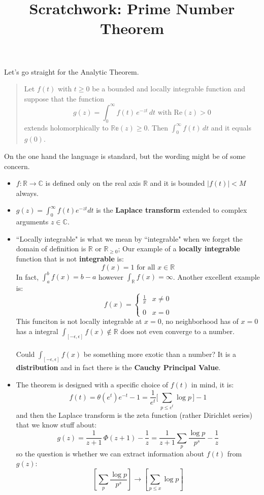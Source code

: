 \documentclass[12pt]{article}
\title{Scratchwork: Prime Number Theorem}
\date{}
\begin{document}

\sffamily

\maketitle

\noindent Let's go straight for the Analytic Theorem. 
\begin{quotation}Let $f(t)$ with $t \geq 0$ be a bounded and locally integrable function and suppose that the function
$$ g(z) = \int_0^\infty f(t) \, e^{-zt} \, dt \text{ with }\mathrm{Re}(z) > 0 $$
extends holomorphically to $\mathbb{Re}(z) \geq 0$.  Then $\int_0^\infty f(t)\, dt$ and it equals $g(0)$.
\end{quotation}
On the one hand the language is standard, but the wording might be of some concern.  
\begin{itemize}
\item $f: \mathbb{R} \to \mathbb{C}$ is defined only on the real axis $\mathbb{R}$ and it is bounded $ |f(t)| < M$ always.
\item $g(z) = \int_0^\infty f(t) e^{-zt} dt$ is the \textbf{Laplace transform} extended to complex arguments $z \in \mathbb{C}$. 
\item ``Locally integrable" is what we mean by ``integrable" when we forget the domain of definition is $\mathbb{R}$ or $\mathbb{R}_{\geq 0}$;  Our example of a \textbf{locally integrable} function that is not \textbf{integrable}  is:
$$ f(x) = 1 \text{ for all }x \in \mathbb{R} $$
In fact, $\int_a^b f(x) = b - a$ however $\int_\mathbb{R} f(x)= \infty$.  Another excellent example is:
$$ f(x) = \left\{
\begin{array}{cc}
\frac{1}{x} & x \neq 0 \\ \\
0 & x = 0 \end{array}
 \right. $$
This funciton is not locally integrable at $x = 0$, no neighborhood has of $x=0$ has a integral $\int_{[-\epsilon, \epsilon]} f(x) \notin \mathbb{R} $ does not even converge to a number. \\ \\ Could $\int_{[-\epsilon, \epsilon]} f(x) $ be something more exotic than a number?  It is a \textbf{distribution} and in fact there is the \textbf{Cauchy Principal Value}. 
\item The theorem is designed with a specific choice of $f(t)$ in mind, it is:
$$ f(t) = \theta(e^t) e^{-t} - 1 = \frac{1}{e^{t}} \bigg[\, \sum_{p \leq e^{t}} \log p \, \bigg] -1 $$
and then the Laplace transform is the zeta function (rather Dirichlet series) that we know stuff about:
$$ g(z) =  \frac{1}{z+1}\,\Phi(z+1) - \frac{1}{z} = 
\frac{1}{z+1} \sum_p \frac{\log p}{p^s} - \frac{1}{z} $$
so the question is whether we can extract information about $f(t)$ from $g(z)$:
$$ \left[ \sum_p \frac{\log p}{p^s} \right] \to \left[ \sum_{p \leq x} \log p \right]$$


\end{itemize}
\end{document}
